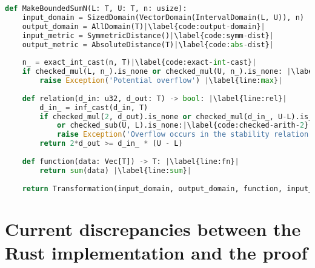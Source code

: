 \documentclass[11pt,a4paper]{article}
\theoremstyle{definition}
\begin{document}
\begin{lstlisting}[language=Python, escapechar=|]
def MakeBoundedSumN(L: T, U: T, n: usize):
    input_domain = SizedDomain(VectorDomain(IntervalDomain(L, U)), n)
    output_domain = AllDomain(T)|\label{code:output-domain}|
    input_metric = SymmetricDistance()|\label{code:symm-dist}|
    output_metric = AbsoluteDistance(T)|\label{code:abs-dist}|
    
    n_ = exact_int_cast(n, T)|\label{code:exact-int-cast}|
    if checked_mul(L, n_).is_none or checked_mul(U, n_).is_none: |\label{code:no-overflow-sum}|
        raise Exception('Potential overflow') |\label{line:max}|
    
    def relation(d_in: u32, d_out: T) -> bool: |\label{line:rel}|
        d_in_ = inf_cast(d_in, T)
        if checked_mul(2, d_out).is_none or checked_mul(d_in_, U-L).is_none|\label{code:checked-arith-1}|
            or checked_sub(U, L).is_none:|\label{code:checked-arith-2}|
            raise Exception('Overflow occurs in the stability relation')
        return 2*d_out >= d_in_ * (U - L)
    
    def function(data: Vec[T]) -> T: |\label{line:fn}|
        return sum(data) |\label{line:sum}|
    
    return Transformation(input_domain, output_domain, function, input_metric, output_metric, stability_relation = relation)
\end{lstlisting}

\section{Current discrepancies between the Rust implementation and the proof}
\end{document}
